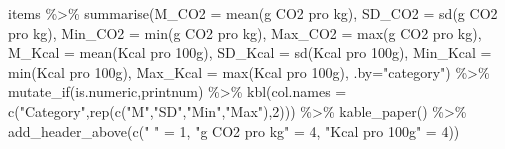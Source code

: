 \documentclass[
  letterpaper,
  DIV=11,
  numbers=noendperiod]{scrartcl}
\newenvironment{Shaded}{\begin{snugshade}}{\end{snugshade}}
\newcommand{\AttributeTok}[1]{\textcolor[rgb]{0.40,0.45,0.13}{#1}}
\newcommand{\DecValTok}[1]{\textcolor[rgb]{0.68,0.00,0.00}{#1}}
\newcommand{\FunctionTok}[1]{\textcolor[rgb]{0.28,0.35,0.67}{#1}}
\newcommand{\NormalTok}[1]{\textcolor[rgb]{0.00,0.23,0.31}{#1}}
\newcommand{\OtherTok}[1]{\textcolor[rgb]{0.00,0.23,0.31}{#1}}
\newcommand{\SpecialCharTok}[1]{\textcolor[rgb]{0.37,0.37,0.37}{#1}}
\newcommand{\StringTok}[1]{\textcolor[rgb]{0.13,0.47,0.30}{#1}}
\begin{document}
\begin{Shaded}
\begin{Highlighting}[]
\NormalTok{items }\SpecialCharTok{\%\textgreater{}\%} 
  \FunctionTok{summarise}\NormalTok{(}\AttributeTok{M\_CO2    =} \FunctionTok{mean}\NormalTok{(}\StringTok{\textasciigrave{}}\AttributeTok{g CO2 pro kg}\StringTok{\textasciigrave{}}\NormalTok{),}
            \AttributeTok{SD\_CO2   =} \FunctionTok{sd}\NormalTok{(}\StringTok{\textasciigrave{}}\AttributeTok{g CO2 pro kg}\StringTok{\textasciigrave{}}\NormalTok{),}
            \AttributeTok{Min\_CO2  =} \FunctionTok{min}\NormalTok{(}\StringTok{\textasciigrave{}}\AttributeTok{g CO2 pro kg}\StringTok{\textasciigrave{}}\NormalTok{),}
            \AttributeTok{Max\_CO2  =} \FunctionTok{max}\NormalTok{(}\StringTok{\textasciigrave{}}\AttributeTok{g CO2 pro kg}\StringTok{\textasciigrave{}}\NormalTok{),}
            \AttributeTok{M\_Kcal   =} \FunctionTok{mean}\NormalTok{(}\StringTok{\textasciigrave{}}\AttributeTok{Kcal pro 100g}\StringTok{\textasciigrave{}}\NormalTok{),}
            \AttributeTok{SD\_Kcal  =} \FunctionTok{sd}\NormalTok{(}\StringTok{\textasciigrave{}}\AttributeTok{Kcal pro 100g}\StringTok{\textasciigrave{}}\NormalTok{),}
            \AttributeTok{Min\_Kcal =} \FunctionTok{min}\NormalTok{(}\StringTok{\textasciigrave{}}\AttributeTok{Kcal pro 100g}\StringTok{\textasciigrave{}}\NormalTok{),}
            \AttributeTok{Max\_Kcal =} \FunctionTok{max}\NormalTok{(}\StringTok{\textasciigrave{}}\AttributeTok{Kcal pro 100g}\StringTok{\textasciigrave{}}\NormalTok{),}
            \AttributeTok{.by=}\StringTok{"category"}\NormalTok{) }\SpecialCharTok{\%\textgreater{}\%} 
  \FunctionTok{mutate\_if}\NormalTok{(is.numeric,printnum) }\SpecialCharTok{\%\textgreater{}\%} 
  \FunctionTok{kbl}\NormalTok{(}\AttributeTok{col.names =} \FunctionTok{c}\NormalTok{(}\StringTok{"Category"}\NormalTok{,}\FunctionTok{rep}\NormalTok{(}\FunctionTok{c}\NormalTok{(}\StringTok{"M"}\NormalTok{,}\StringTok{"SD"}\NormalTok{,}\StringTok{"Min"}\NormalTok{,}\StringTok{"Max"}\NormalTok{),}\DecValTok{2}\NormalTok{))) }\SpecialCharTok{\%\textgreater{}\%} 
  \FunctionTok{kable\_paper}\NormalTok{() }\SpecialCharTok{\%\textgreater{}\%} 
  \FunctionTok{add\_header\_above}\NormalTok{(}\FunctionTok{c}\NormalTok{(}\StringTok{" "} \OtherTok{=} \DecValTok{1}\NormalTok{, }\StringTok{"g CO2 pro kg"} \OtherTok{=} \DecValTok{4}\NormalTok{, }\StringTok{"Kcal pro 100g"} \OtherTok{=} \DecValTok{4}\NormalTok{))}
\end{Highlighting}
\end{Shaded}
\end{document}
